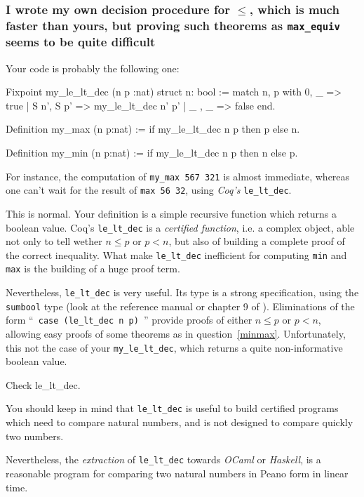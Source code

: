 \documentclass[a4paper,pdftex]{article}
\def\Question#1{\stepcounter{question}\subsubsection{#1}}
\begin{document}
\Question{I wrote my own decision procedure for $\leq$, which
is much  faster than yours, but proving such theorems as
 \texttt{max\_equiv} seems to be quite difficult}

Your code is probably the following one:

\begin{coq_example}
Fixpoint my_le_lt_dec (n p :nat) {struct n}: bool  :=
 match n, p with 0, _ => true
               | S n', S p' => my_le_lt_dec n' p'
               | _   , _    => false
 end.

Definition my_max (n p:nat) := if my_le_lt_dec n p then p else n.

Definition my_min (n p:nat) := if my_le_lt_dec n p then n else p.
\end{coq_example}


For instance, the computation of \texttt{my\_max 567 321} is almost
immediate, whereas one can't wait for  the result of 
\texttt{max 56 32}, using \emph{Coq's} \texttt{le\_lt\_dec}.

This is normal. Your definition is a simple recursive function which
returns a boolean value. Coq's \texttt{le\_lt\_dec} is a \emph{certified
function}, i.e. a complex object, able not only to tell wether $n\leq p$
or $p<n$, but also of building a complete proof of the correct inequality.
What make \texttt{le\_lt\_dec} inefficient for computing \texttt{min}
and \texttt{max} is the building of a huge proof term.

Nevertheless,  \texttt{le\_lt\_dec} is very useful. Its type 
is a strong specification, using the
\texttt{sumbool} type (look at the reference manual or chapter 9 of
\cite{coqart}). Eliminations of the form
``~\texttt{case (le\_lt\_dec n p)}~'' provide proofs of
either $n \leq p$ or $p < n$, allowing easy proofs of some theorems as in
question~\ref{minmax}. Unfortunately, this not the case of your
\texttt{my\_le\_lt\_dec}, which returns a quite non-informative boolean
value.


\begin{coq_example}
Check le_lt_dec.
\end{coq_example}

You should keep in mind that \texttt{le\_lt\_dec} is useful to build
certified programs which need to compare natural numbers, and is not
designed to compare quickly two numbers.

Nevertheless, the \emph{extraction} of \texttt{le\_lt\_dec} towards 
\emph{OCaml} or \emph{Haskell}, is a reasonable program for comparing two
natural numbers in Peano form in linear time.
\end{document}
